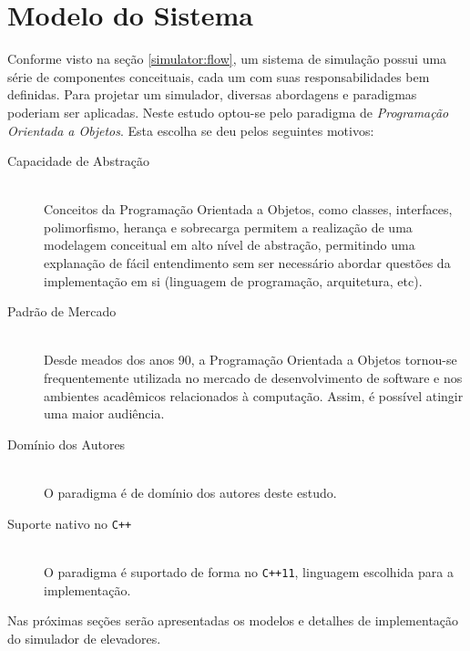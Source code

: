\chapter{\label{chap:model}Modelo do Sistema}

Conforme visto na seção \ref{simulator:flow}, um sistema de simulação possui uma
série de componentes conceituais, cada um com suas responsabilidades bem
definidas. Para projetar um simulador, diversas abordagens e paradigmas poderiam
ser aplicadas. Neste estudo optou-se pelo paradigma de \textit{Programação
Orientada a Objetos}. Esta escolha se deu pelos seguintes motivos:

\begin{description}
  \item[Capacidade de Abstração]\hfill \\
    Conceitos da Programação Orientada a Objetos, como classes, interfaces,
    polimorfismo, herança e sobrecarga permitem a realização de uma modelagem
    conceitual em alto nível de abstração, permitindo uma explanação de fácil
    entendimento sem ser necessário abordar questões da implementação em si
    (linguagem de programação, arquitetura, etc).
  \item[Padrão de Mercado]\hfill \\
    Desde meados dos anos 90, a Programação Orientada a Objetos tornou-se
    frequentemente utilizada no mercado de desenvolvimento de software e nos
    ambientes acadêmicos relacionados à computação. Assim, é possível atingir
    uma maior audiência.
  \item[Domínio dos Autores]\hfill \\
    O paradigma é de domínio dos autores deste estudo.
  \item[Suporte nativo no \texttt{C++}]\hfill \\
    O paradigma é suportado de forma no \texttt{C++11}, linguagem escolhida para
    a implementação.
\end{description}

Nas próximas seções serão apresentadas os modelos e detalhes de implementação do
simulador de elevadores.


